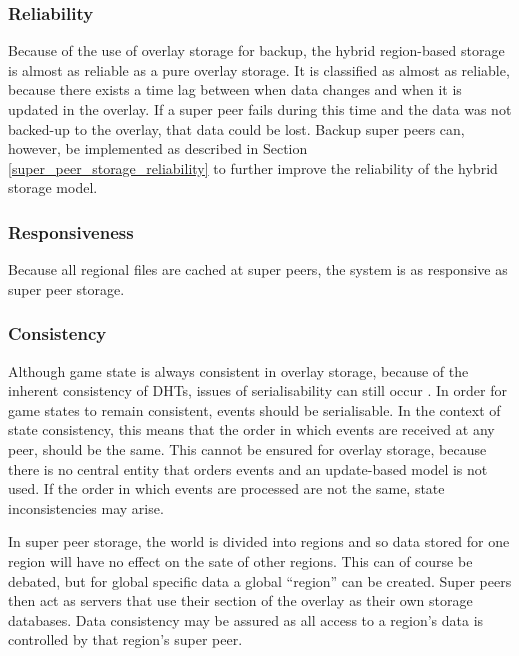 \documentclass[10pt,a4paper,journal,cspaper,compsoc]{IEEEtran}
\begin{document}
\subsubsection{Reliability}
\label{hybrid_storage_reliability}

Because of the use of overlay storage for backup, the hybrid region-based storage is almost as reliable as a pure overlay storage. It is classified
as almost as reliable, because there exists a time lag between when data changes and when it is updated in the overlay. If a super peer fails during
this time and the data was not backed-up to the overlay, that data could be lost. Backup super peers can, however, be implemented as described in
Section \ref{super_peer_storage_reliability} to further improve the reliability of the hybrid storage model.

\subsubsection{Responsiveness}

Because all regional files are cached at super peers, the system is as responsive as super peer storage.

\subsubsection{Consistency}

Although game state is always consistent in overlay storage, because of the inherent consistency of DHTs, issues of serialisability can still occur
\cite{zoned_federation}. In order for game states to remain consistent, events should be serialisable. In the context of state consistency, this
means that the order in which events are received at any peer, should be the same. This cannot be ensured for overlay storage, because there is no
central entity that orders events and an update-based model is not used. If the order in which events are processed are not the same, state
inconsistencies may arise.

In super peer storage, the world is divided into regions and so data stored for one region will have no effect on the sate of other regions. This can
of course be debated, but for global specific data a global ``region'' can be created. Super peers then act as servers that use their section of the
overlay as their own storage databases. Data consistency may be assured as all access to a region's data is controlled by that region's super peer.
\end{document}
